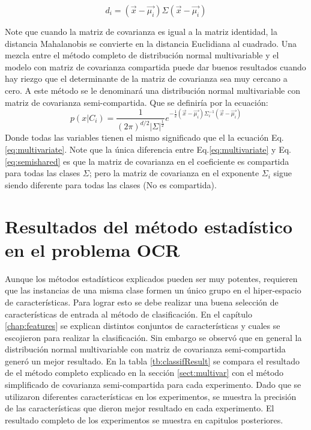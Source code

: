 \documentclass[a4paper, 11pt, oneside]{report}
\begin{document}
\begin{equation}
	\label{eq:mahalanobis}
	d_i = (\vec{x}-\vec{\mu_i})\Sigma(\vec{x}-\vec{\mu_i}) 
\end{equation}

Note que cuando la matriz de covarianza es igual a la matriz identidad, la distancia Mahalanobis se convierte en la distancia Euclidiana al cuadrado.\newline \newline
Una mezcla entre el método completo de distribución normal multivariable y el modelo con matriz de covarianza compartida puede dar buenos resultados cuando hay riezgo que el determinante de la matriz de covarianza sea muy cercano a cero. A este método se le denominará una distribución normal multivariable con matriz de covarianza semi-compartida. Que se definiría por la ecuación:
\begin{equation}\label{eq:semishared}
	p(x|C_i) = \frac{1}{(2\pi)^{d/2}|\Sigma|^\frac{1}{2}} e^{-\frac{1}{2}(\vec{x}-\vec{\mu_i})\Sigma_i^{-1}(\vec{x}-\vec{\mu_i})}
\end{equation}
Donde todas las variables tienen el mismo significado que el la ecuación Eq.\ref{eq:multivariate}. Note que la única diferencia entre Eq.\ref{eq:multivariate} y Eq.\ref{eq:semishared} es que la matriz de covarianza en el coeficiente es compartida para todas las clases $\Sigma$; pero la matriz de covarianza en el exponente $\Sigma_i$ sigue siendo diferente para todas las clases (No es compartida).

\section{Resultados del método estadístico en el problema OCR}	
Aunque los métodos estadísticos explicados pueden ser muy potentes, requieren que las instancias de una misma clase formen un único grupo en el hiper-espacio de características. Para lograr esto se debe realizar una buena selección de características de entrada al método de clasificación. En el capítulo \ref{chap:features} se explican distintos conjuntos de características y cuales se escojieron para realizar la clasificación. Sin embargo se observó que en general la distribución normal multivariable con matriz de covarianza semi-compartida generó un mejor resultado. En la tabla \ref{tb:classifResult} se compara el resultado de el método completo explicado en la sección \ref{sect:multivar} con el método simplificado de covarianza semi-compartida para cada experimento. Dado que se utilizaron diferentes características en los experimentos, se muestra la precisión de las características que dieron mejor resultado en cada experimento. El resultado completo de los experimentos se muestra en capitulos posteriores.
\end{document}
